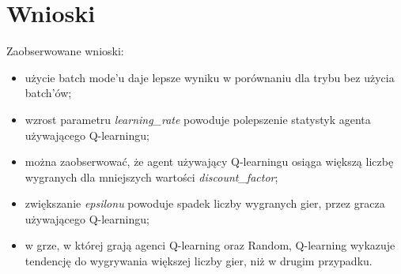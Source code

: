 \section{Wnioski}

Zaobserwowane wnioski:
\begin{itemize}
	\item użycie batch mode'u daje lepsze wyniku w porównaniu dla trybu bez użycia batch'ów;
	\item wzrost parametru \textit{learning\_rate} powoduje polepszenie statystyk agenta używającego Q-learningu;
	\item można zaobserwować, że agent używający Q-learningu osiąga większą liczbę wygranych dla mniejszych wartości \textit{discount\_factor};
	\item zwiększanie \textit{epsilonu} powoduje spadek liczby wygranych gier, przez gracza używającego Q-learningu;
	\item w grze, w której grają agenci Q-learning oraz Random, Q-learning wykazuje tendencję do wygrywania większej liczby gier, niż w drugim przypadku.
\end{itemize}